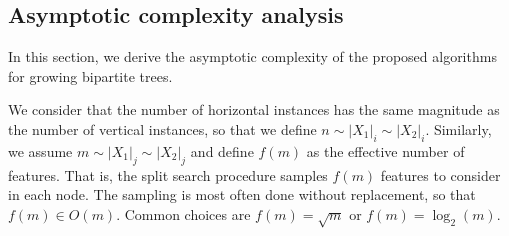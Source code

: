 

\subsection{Asymptotic complexity analysis}
\label{sec:complexity_analysis}


In this section, we derive the asymptotic complexity of the proposed algorithms for growing bipartite trees.

We consider that the number of horizontal instances has the same magnitude as the number of vertical instances, so that we define $n \sim |X_1|_i \sim |X_2|_i$.
Similarly, we assume $m \sim |X_1|_j \sim |X_2|_j$ and define $f(m)$ as the effective number of features. That is, the split search procedure samples $f(m)$ features to consider in each node. The sampling is most often done without replacement, so that $f(m) \in O(m)$. Common choices are $f(m) = \sqrt{m}$ or $f(m) = \log_2(m)$.

